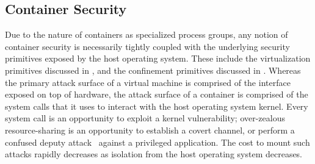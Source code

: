 
\subsection{Container Security}%
\label{ss:container-security-bg}

Due to the nature of containers as specialized process groups, any notion of container
security is necessarily tightly coupled with the underlying security primitives exposed by
the host operating system. These include the virtualization primitives discussed in
, and the confinement primitives discussed in
. Whereas the primary attack surface
of a virtual machine is comprised of the interface exposed on top of hardware, the attack
surface of a container is comprised of the system calls that it uses to interact with the
host operating system kernel. Every system call is an opportunity to exploit a kernel
vulnerability; over-zealous resource-sharing is an opportunity to establish a covert
channel, or perform a confused deputy attack~\cite{hardy1988_confused_deputy} against
a privileged application. The cost to mount such attacks rapidly decreases as isolation
from the host operating system decreases.

